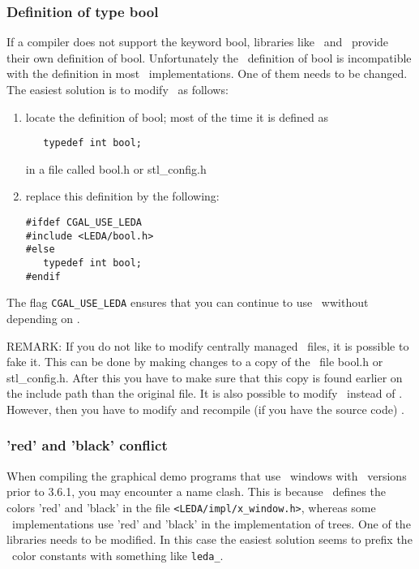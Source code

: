 \subsubsection{Definition of type bool}

If a compiler does not support the keyword bool, libraries like \leda\ 
and \stl\ provide their own definition of bool. Unfortunately the
\leda\ definition of bool is incompatible with the definition in most
\stl\ implementations. One of them needs to be changed. The easiest
solution is to modify \stl\ as follows:

\begin{enumerate}
\item locate the definition of bool; most of the time it is defined as

\begin{verbatim}
   typedef int bool;
\end{verbatim}

in a file called bool.h or stl\_config.h

\item replace this definition by the following:

\begin{verbatim}
#ifdef CGAL_USE_LEDA
#include <LEDA/bool.h>
#else
   typedef int bool;
#endif
\end{verbatim}
\end{enumerate}

The flag \texttt{CGAL\_USE\_LEDA} ensures that you can continue to use \stl\ wwithout
depending on \leda.

REMARK: If you do not like to modify centrally managed \stl\ files, it
is possible to fake it. This can be done by making changes to a copy
of the \stl\ file bool.h or stl\_config.h. After this you have to make
sure that this copy is found earlier on the include path than the
original file.  It is also possible to modify \leda\ instead of \stl.
However, then you have to modify and recompile (if you have the source
code) \leda.

\subsubsection{'red' and 'black' conflict}

When compiling the graphical demo programs that use \leda\ windows
with \leda\ versions prior to 3.6.1, you may encounter a name clash.
This is because \leda\ defines the colors 'red' and 'black' in the
file \texttt{<LEDA/impl/x\_window.h>}, whereas some \stl\ 
implementations use 'red' and 'black' in the implementation of trees.
One of the libraries needs to be modified. In this case the easiest
solution seems to prefix the \leda\ color constants with something
like \texttt{leda\_}.

